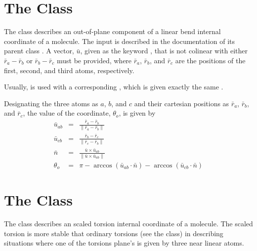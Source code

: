 
\section{The  Class}\label{LinOPSimpleCo}

The  class describes an out-of-plane component of a
linear bend internal coordinate of a molecule.  The input is described in
the documentation of its parent class .  A vector,
$\bar{u}$, given as the keyword , that is not colinear with either
$\bar{r}_a - \bar{r}_b$ or $\bar{r}_b - \bar{r}_c$ must be provided, where
$\bar{r}_a$, $\bar{r}_b$, and $\bar{r}_c$ are the positions of the first,
second, and third atoms, respectively.

  Usually,  is used with a corresponding
, which is given exactly the same .

Designating the three atoms as $a$, $b$, and $c$ and their cartesian
positions as $\bar{r}_a$, $\bar{r}_b$, and $\bar{r}_c$, the value of the
coordinate, $\theta_o$, is given by
\begin{eqnarray*}
 \bar{u}_{ab} &=& \frac{\bar{r}_a - \bar{r}_b}{\| \bar{r}_a - \bar{r}_b \|}\\
 \bar{u}_{cb} &=& \frac{\bar{r}_b - \bar{r}_c}{\| \bar{r}_c - \bar{r}_b \|}\\
 \bar{n}      &=& \frac{\bar{u} \times \bar{u}_{ab}}
                       {\| \bar{u} \times \bar{u}_{ab} \|}\\
 \theta_o     &=& \pi - \arccos ( \bar{u}_{ab} \cdot \bar{n} )
                      - \arccos ( \bar{u}_{cb} \cdot \bar{n} )
\end{eqnarray*}


\section{The  Class}\label{ScaledTorsSimpleCo}

The  class describes an scaled torsion internal
coordinate of a molecule.  The scaled torsion is more stable that ordinary
torsions (see the  class) in describing situations
where one of the torsions plane's is given by three near linear atoms.


